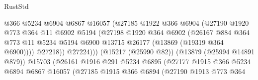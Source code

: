 \begin{lexlean}{RustStd}
\begin{coremodule}
                                      @366
                                      @5234
                                      @6904
                                      @6867
                                      @16057
                                      (@27185
                                        @1922
                                        @366
                                        @6904
                                        (@27190
                                          @1920
                                          @773
                                          @364
                                          @11
                                          @6902
                                          @5194
                                          (@27198
                                            @1920
                                            @364
                                            @6902
                                            (@26167
                                              @884
                                              @364
                                              @773
                                              @11
                                              @5234
                                              @5194
                                              @6900
                                              @13715
                                              @26177
                                              (@13869 (@19319 @364 @6900))))
                                          @27218))
                                      @27224)))
                                (@15217 (@25990 @82))
                                (@13879 (@25994 @14891 @879))
                                @15703
                                (@26161
                                  @1916
                                  @291
                                  @5234
                                  @6895
                                  (@27177
                                    @1915
                                    @366
                                    @5234
                                    @6894
                                    @6867
                                    @16057
                                    (@27185
                                      @1915
                                      @366
                                      @6894
                                      (@27190
                                        @1913
                                        @773
                                        @364

\end{coremodule}
\end{lexlean}
